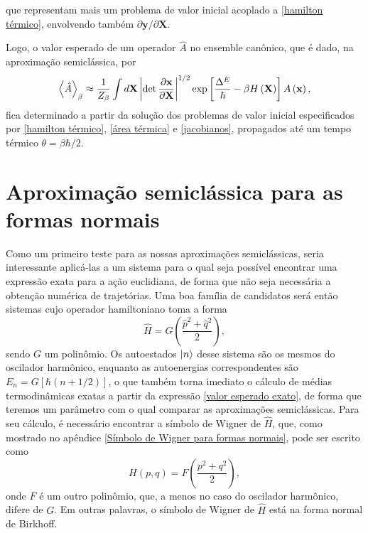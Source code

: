 \documentclass[
	12pt,
	oneside,			%
	a4paper,			%
	english,			%
	brazil				%
	]{abntex2}
\theoremstyle{definition}
\begin{document}
que representam mais um problema de valor inicial acoplado a \eqref{hamilton térmico}, envolvendo também $\partial \mathbf{y}/\partial \mathbf{X}$.

Logo, o valor esperado de um operador $\hat{A}$ no ensemble canônico, que é dado, na aproximação semiclássica, por
\begin{equation}
\label{aproximação semiclassica termica}
    \ev{\hat{A}}_\beta \approx \frac{1}{Z_\beta} \int d \mathbf{X} \left| \det \frac{\partial \mathbf{x}}{\partial \mathbf{X}} \right|^{1/2} \exp \left[ \frac{\Delta^E}{\hbar} - \beta H\left( \mathbf{X}\right) \right] A \left( \mathbf{x} \right),
\end{equation}
fica determinado a partir da solução dos problemas de valor inicial especificados por \eqref{hamilton térmico}, \eqref{área térmica} e \eqref{jacobianos}, propagados até um tempo térmico $\theta = \beta \hbar/2$.

\chapter{Aproximação semiclássica para as formas normais}
\label{Dinâmica gerada por formas normais}

Como um primeiro teste para as nossas aproximações semiclássicas, seria interessante aplicá-las a um sistema para o qual seja possível encontrar uma expressão exata para a ação euclidiana, de forma que não seja necessária a obtenção numérica de trajetórias. Uma boa família de candidatos será então sistemas cujo operador hamiltoniano toma a forma
\begin{equation}
\label{operador forma normal}
    \hat{H} = G \left( \frac{\hat{p}^2+\hat{q}^2}{2} \right),
\end{equation}
sendo $G$ um polinômio. Os autoestados $\ket{n}$ desse sistema são os mesmos do oscilador harmônico, enquanto as autoenergias correspondentes são $E_n = G\left[\hbar\left(n+1/2 \right) \right]$, o que também torna imediato o cálculo de médias termodinâmicas exatas a partir da expressão \eqref{valor esperado exato}, de forma que teremos um parâmetro com o qual comparar as aproximações semiclássicas. Para seu cálculo, é necessário encontrar a símbolo de Wigner de $\hat{H}$, que, como mostrado no apêndice \ref{Símbolo de Wigner para formas normais}, pode ser escrito como
\begin{equation}
     H(p,q) = F \left( \frac{p^2+q^2}{2} \right),
\end{equation}
onde $F$ é um outro polinômio, que, a menos no caso do oscilador harmônico, difere de $G$. Em outras palavras, o símbolo de Wigner de $\hat{H}$ está na forma normal de Birkhoff.
\end{document}
